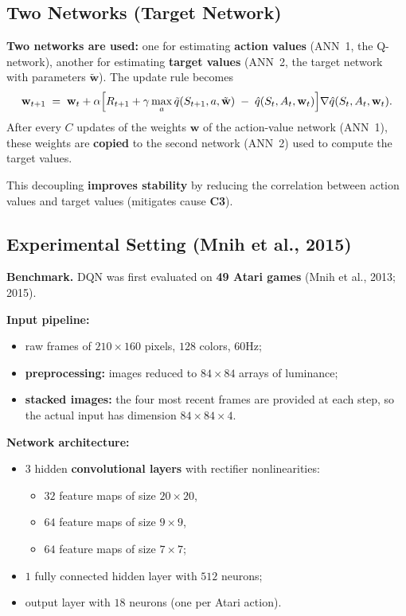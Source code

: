 \documentclass[11pt,a4paper]{article}
\theoremstyle{definition}
\theoremstyle{plain}
\theoremstyle{remark}
\begin{document}
\subsection{Two Networks (Target Network)}

\textbf{Two networks are used:} one for estimating \textbf{action values} (ANN~1, the Q-network), another for estimating \textbf{target values} (ANN~2, the target network with parameters $\tilde{\mathbf{w}}$). The update rule becomes
\[
    \mathbf{w}_{t+1} \;=\; \mathbf{w}_t + \alpha \Bigl[R_{t+1} + \gamma \max_{a} \tilde{q}(S_{t+1}, a, \tilde{\mathbf{w}}) \;-\; \hat{q}(S_t, A_t, \mathbf{w}_t)\Bigr] \nabla \hat{q}(S_t, A_t, \mathbf{w}_t).
\]
After every $C$ updates of the weights $\mathbf{w}$ of the action-value network (ANN~1), these weights are \textbf{copied} to the second network (ANN~2) used to compute the target values.

\begin{tcolorbox}[colback=green!5!white, colframe=green!60!black, title={Advantage of the Target Network}]
This decoupling \textbf{improves stability} by reducing the correlation between action values and target values (mitigates cause \textbf{C3}).
\end{tcolorbox}

\subsection{Experimental Setting (Mnih et al., 2015)}

\textbf{Benchmark.} DQN was first evaluated on \textbf{49 Atari games} (Mnih et al., 2013; 2015).

\textbf{Input pipeline:}
\begin{itemize}
    \item raw frames of $210 \times 160$ pixels, $128$ colors, $60$Hz;
    \item \textbf{preprocessing:} images reduced to $84 \times 84$ arrays of luminance;
    \item \textbf{stacked images:} the four most recent frames are provided at each step, so the actual input has dimension $84 \times 84 \times 4$.
\end{itemize}

\textbf{Network architecture:}
\begin{itemize}
    \item $3$ hidden \textbf{convolutional layers} with rectifier nonlinearities:
    \begin{itemize}
        \item $32$ feature maps of size $20 \times 20$,
        \item $64$ feature maps of size $9 \times 9$,
        \item $64$ feature maps of size $7 \times 7$;
    \end{itemize}
    \item $1$ fully connected hidden layer with $512$ neurons;
    \item output layer with $18$ neurons (one per Atari action).
\end{itemize}
\end{document}
